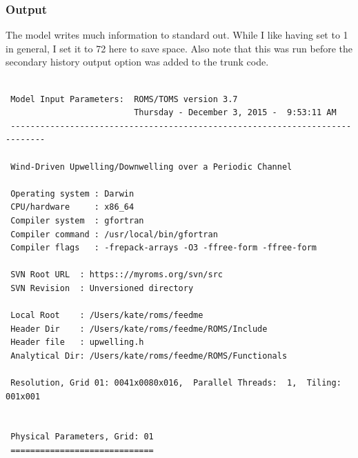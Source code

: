 \subsubsection{Output}
\label{Output}
The model writes much information to standard out. While I like
having  set to 1 in general, I set it to 72 here to save
space. Also note that this was run before the secondary history output
option was added to the trunk code.
\begin{verbatim}

 Model Input Parameters:  ROMS/TOMS version 3.7  
                          Thursday - December 3, 2015 -  9:53:11 AM
 -----------------------------------------------------------------------------

 Wind-Driven Upwelling/Downwelling over a Periodic Channel

 Operating system : Darwin
 CPU/hardware     : x86_64
 Compiler system  : gfortran
 Compiler command : /usr/local/bin/gfortran
 Compiler flags   : -frepack-arrays -O3 -ffree-form -ffree-form

 SVN Root URL  : https:://myroms.org/svn/src
 SVN Revision  : Unversioned directory

 Local Root    : /Users/kate/roms/feedme
 Header Dir    : /Users/kate/roms/feedme/ROMS/Include
 Header file   : upwelling.h
 Analytical Dir: /Users/kate/roms/feedme/ROMS/Functionals

 Resolution, Grid 01: 0041x0080x016,  Parallel Threads:  1,  Tiling: 001x001


 Physical Parameters, Grid: 01
 =============================


\end{verbatim}
